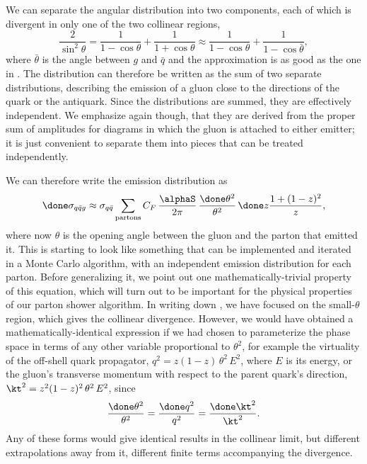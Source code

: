 We can separate the angular distribution into two components, each of
which is divergent in only one of the two collinear regions,
\begin{equation}
  \frac2{\sin^2\theta} = \frac1{1-\cos\theta} + \frac1{1+\cos\theta}
  \approx \frac1{1-\cos\theta} + \frac1{1-\cos\bar\theta},
\end{equation}
where $\bar\theta$ is the angle between $g$ and $\bar{q}$ and the
approximation is as good as the one in .  The
distribution can therefore be written as the sum of two separate
distributions, describing the emission of a gluon close to the
directions of the quark or the antiquark.  Since the distributions are
summed, they are effectively independent.  We emphasize again though,
that they are derived from the proper sum of amplitudes for diagrams in
which the gluon is attached to either emitter; it is just convenient to
separate them into pieces that can be treated independently.

We can therefore write the emission distribution as
\begin{equation}
  \label{firstcollinear}
  \done\sigma_{q\bar qg} \approx \sigma_{q\bar q} \sum_{\mathrm{partons}}
  C_F \, \frac{\alphaS}{2\pi} \, \frac{\done\theta^2}{\theta^2}
  \, \done z\frac{1+(1-z)^2}z,
\end{equation}
where now $\theta$ is the opening angle between the gluon and the parton
that emitted it.  This is starting to look like something that can be
implemented and iterated in a Monte Carlo algorithm, with an independent
emission distribution for each parton.  Before generalizing it, we point
out one mathematically-trivial property of this equation, which will
turn out to be important for the physical properties of our parton
shower algorithm.  In writing down , we have
focused on the small-$\theta$ region, which gives the collinear
divergence.  However, we would have obtained a mathematically-identical
expression if we had chosen to parameterize the phase space in terms of
any other variable proportional to $\theta^2$, for example the
virtuality of the off-shell quark propagator,
$q^2=z(1-z)\,\theta^2\,E^2$, where $E$
is its energy, or the gluon's transverse momentum with respect to the
parent quark's direction,
$\kt^2=z^2(1-z)^2\,\theta^2\,E^2$, since
\begin{equation}
  \label{eq:evolchoices}
  \frac{\done\theta^2}{\theta^2} = \frac{\done q^2}{q^2} =
  \frac{\done\kt^2}{\kt^2}.
\end{equation}
Any of these forms would give identical results in the collinear limit,
but different extrapolations away from it, \ie different finite terms
accompanying the divergence.


